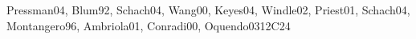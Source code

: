 \begin{syllabus}
\begin{unit}{\SESoftwareProjectManagement}{}{Pressman04, Blum92, Schach04, Wang00, Keyes04, Windle02, Priest01, Schach04, Montangero96, Ambriola01, Conradi00, Oquendo03}{12}{C24}
    \begin{topics}%
    \item \SESoftwareProjectManagementTopicTeam
    \item \SESoftwareProjectManagementTopicEffort
    \item \SESoftwareProjectManagementTopicRisk
    \item \SESoftwareProjectManagementTopicTeamManagement
    \item \SESoftwareProjectManagementTopicProject
    \item \SESoftwareProjectManagementTopicSoftwareMeasurement
    \item \SESoftwareProjectManagementTopicSoftwareQuality
    \item \SESoftwareProjectManagementTopicRiskS
    \item \SESoftwareProjectManagementTopicSystem
\end{topics}
\begin{learningoutcomes}
    \item \SESoftwareProjectManagementLODiscussCommon[\Usage]
    \item \SESoftwareProjectManagementLOCreateAndAgenda[\Usage]
    \item \SESoftwareProjectManagementLOIdentifyAndRoles[\Usage]
    \item \SESoftwareProjectManagementLOUnderstandTheAnd[\Usage]
    \item \SESoftwareProjectManagementLOApplyAStrategy[\Usage]
    \item \SESoftwareProjectManagementLOUseAn[\Usage]
    \item \SESoftwareProjectManagementLOListSeveral[\Usage]
    \item \SESoftwareProjectManagementLODescribeTheRiskSoftware[\Usage]
    \item \SESoftwareProjectManagementLODescribeDifferent[\Usage]
    \item \SESoftwareProjectManagementLODemonstrateThrough[\Usage]
\end{learningoutcomes}
\end{unit}

\begin{coursebibliography}
\end{coursebibliography}

\end{syllabus}
